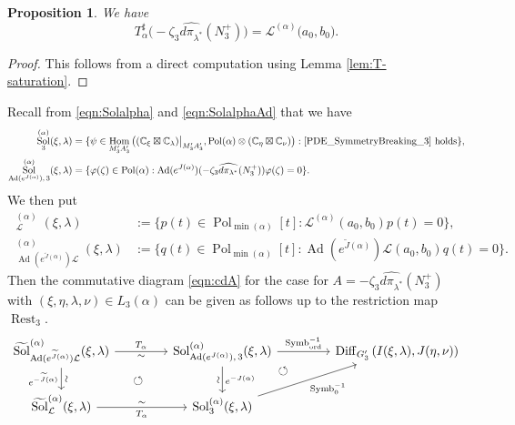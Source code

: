 \documentclass[a4paper,11pt,reqno]{amsart}
\newcommand{\CC}{\mathbb{C}}
\newcommand{\calL}{\mathcal{L}}
\newcommand{\0}{{\bf 0}}
\newcommand{\1}{{\bf 1}}
\DeclareMathOperator{\Ad}{Ad}
\DeclareMathOperator{\Hom}{Hom}
\DeclareMathOperator{\Pol}{Pol}
\newcommand{\ord}{{\mathrm{ord}}}
\DeclareMathOperator{\Diff}{Diff}
\DeclareMathOperator{\Sol}{Sol}
\newcommand{\wJ}{\widetilde{J}}
\DeclareMathOperator{\Symb}{Symb}
\DeclareMathOperator{\Rest}{Rest}
\DeclareMathOperator{\wSol}{\widetilde{\Sol}}
\theoremstyle{plain}
\newtheorem{proposition}[equation]{Proposition}
\theoremstyle{definition}
\numberwithin{equation}{section}
\theoremstyle{definition}
\begin{document}
\begin{proposition}\label{prop:ODEdiffoperator3}
We have
\begin{equation*}
T_\alpha^\sharp \big(-\zeta_3\widehat{d\pi_{\lambda^*}}(N_3^+)\big)
=\calL^{(\alpha)}(a_0,b_0\big).
\end{equation*}
\end{proposition}

\begin{proof}
This follows from a direct computation using Lemma \ref{lem:T-saturation}.
\end{proof}

Recall from \eqref{eqn:Solalpha} and \eqref{eqn:SolalphaAd} that we have
\begin{align*}
\Sol_3^{(\alpha)}(\xi,\lambda) &= \{ \psi \in \Hom_{M_3'A_3'}\big((\CC_\xi\boxtimes \CC_{\lambda})\big\rvert_{M_3'A_3'},\Pol(\alpha)\otimes (\CC_\eta\boxtimes \CC_{\nu})\big) : \eqref{PDE_SymmetryBreaking_3} \text{ holds}\},\\
\Sol_{\Ad(e^{J(\alpha)}),\,3}^{(\alpha)}(\xi,\lambda)
&=\{\varphi(\zeta) \in \Pol(\alpha) : 
\Ad(e^{J(\alpha)})(-\zeta_3\widehat{d\pi_{\lambda^*}}(N_3^+))\varphi(\zeta)=0\}.
\end{align*}
We then put
\begin{align*}
\wSol_\calL^{(\alpha)}(\xi,\lambda) &:= \{p(t) \in \Pol_{\min(\alpha)}[t] : 
\calL^{(\alpha)}(a_0,b_0)p(t) = 0\},\\
\wSol_{\Ad(e^{\wJ(\alpha)}) \calL}^{(\alpha)}(\xi,\lambda)
&:=\{q(t) \in \Pol_{\min(\alpha)}[t] : 
\Ad(e^{\wJ(\alpha)})\calL(a_0,b_0)q(t)=0\}.
\end{align*}
Then the commutative diagram \eqref{eqn:cdA} 
for the case for $A = -\zeta_3\widehat{d\pi_{\lambda^*}}(N_3^+)$
with $(\xi,\eta,\lambda, \nu)\in L_3(\alpha)$
can be given as follows up to the restriction map $\Rest_3$.
\begin{equation}\label{eqn:cdSol3}
\begin{tikzcd}[column sep=1.5cm]
	{\wSol_{\Ad(e^{\wJ(\alpha)}) \calL}^{(\alpha)}(\xi,\lambda)} & 
	\Sol_{\Ad(e^{J(\alpha)}),\,3}^{(\alpha)}(\xi,\lambda)  	
	\arrow[dl, pos=0.5, phantom, "\circlearrowleft"]
	&{\Diff_{G_3^\prime}\left(I(\xi, \lambda), J(\eta, \nu)\right)} \\
	{\wSol_\calL^{(\alpha)}(\xi,\lambda)}  & {\Sol_3^{(\alpha)}(\xi,\lambda)} &
	\arrow[ul, pos=0.886, phantom, "\circlearrowleft"]
	\arrow["\Symb_{\ord}^{-1}", from=1-2, to=1-3]
	\arrow["\Symb_0^{-1}"', from=2-2, to=1-3]
	\arrow["{T_\alpha}", "\sim"' , from=1-1, to=1-2]
	\arrow["\sim" sloped, "e^{-\wJ(\alpha)}"', from=1-1, to=2-1]
	\arrow["e^{-J(\alpha)}", "\sim"' sloped,  from=1-2, to=2-2]
	\arrow["\sim" , "{T_\alpha}"',  from=2-1, to=2-2]
\end{tikzcd}
\end{equation}
\end{document}
